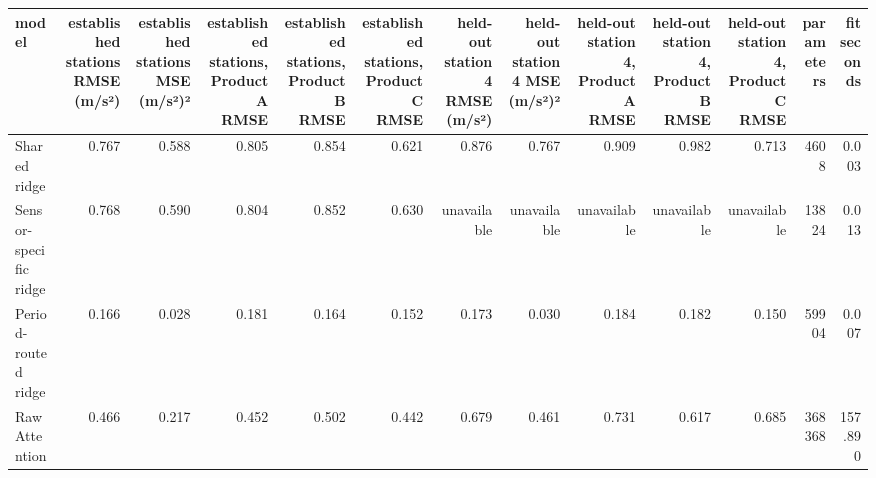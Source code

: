\begin{tabular}{lrrrrrrrrrrrr}
\toprule
model & established stations RMSE (m/s²) & established stations MSE (m/s²)² & established stations, Product A RMSE & established stations, Product B RMSE & established stations, Product C RMSE & held-out station 4 RMSE (m/s²) & held-out station 4 MSE (m/s²)² & held-out station 4, Product A RMSE & held-out station 4, Product B RMSE & held-out station 4, Product C RMSE & parameters & fit seconds \\
\midrule
Shared ridge & 0.767 & 0.588 & 0.805 & 0.854 & 0.621 & 0.876 & 0.767 & 0.909 & 0.982 & 0.713 & 4608 & 0.003 \\
Sensor-specific ridge & 0.768 & 0.590 & 0.804 & 0.852 & 0.630 & unavailable & unavailable & unavailable & unavailable & unavailable & 13824 & 0.013 \\
Period-routed ridge & 0.166 & 0.028 & 0.181 & 0.164 & 0.152 & 0.173 & 0.030 & 0.184 & 0.182 & 0.150 & 59904 & 0.007 \\
Raw Attention & 0.466 & 0.217 & 0.452 & 0.502 & 0.442 & 0.679 & 0.461 & 0.731 & 0.617 & 0.685 & 368368 & 157.890 \\
\bottomrule
\end{tabular}
